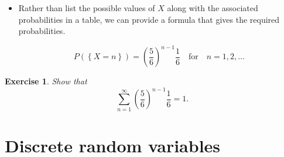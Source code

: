 \documentclass[smaller, handout]{beamer}\usepackage[]{graphicx}\usepackage[]{color}
\newtheorem{exercise}{Exercise}[section]
\newenvironment{stepitemize}{\begin{itemize}[<+->]}{\end{itemize} }
\begin{document}
\begin{frame}{\secname}
  \begin{example}[continued]
  \begin{footnotesize}
  \begin{stepitemize}

  \item Rather than list the possible values of $X$ along with the associated
  probabilities in a table, we can provide a formula that gives the required
  probabilities.

  \begin{equation*}
  P(\left\{ X=n \right\})=\left(\frac{5}{6}\right)^{n-1}\frac{1}{6}\quad\text{for}
  \quad n=1,2,\ldots
  \end{equation*}
  \end{stepitemize}
  \end{footnotesize}
  \end{example}
  \begin{exercise}
  Show that
  \begin{equation*}
  \sum_{n=1}^\infty\left(\frac{5}{6}\right)^{n-1}\frac{1}{6}=1.
  \end{equation*}
  \end{exercise}
\end{frame}

\section{Discrete random variables}

\end{document}
